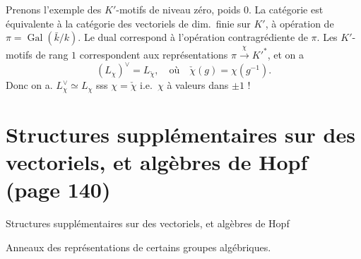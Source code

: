 \documentclass[11pt,a4paper]{article}
\begin{document}
Prenons l'exemple des $K'$-motifs de niveau zéro, poids $0$. La catégorie est
équivalente à la catégorie des \struck{\ill{}} vectoriels de dim.\ finie sur
$K'$, \struck{\ill{}} \ill{} à opération  de
$\pi = \operatorname{Gal}(\bar{k}/k)$. Le dual correspond à l'opération
contragrédiente de $\pi$. Les $K'$-motifs de rang $1$ 
correspondent aux représentations  
$\pi \xrightarrow{\ \chi\ } K'^{*}$, et on a
\[ (L_{\chi})^{\vee} = L_{\check{\chi}} , \quad \text{où} \quad
   \check{\chi}(g) = \chi(g^{-1}) . \]
Donc on a. $L_{\chi}^{\vee} \simeq L_{\chi}$ sss $\chi = \check{\chi}$ i.e.\
$\chi$ à valeurs dans $\pm 1$ !

\section*{Structures supplémentaires sur des vectoriels, et algèbres de Hopf (page 140)}


\struck{\ill{}}

Structures supplémentaires sur des vectoriels, et algèbres de Hopf
\uncertain{top.}

Anneaux des représentations de certains groupes algébriques.
\end{document}
